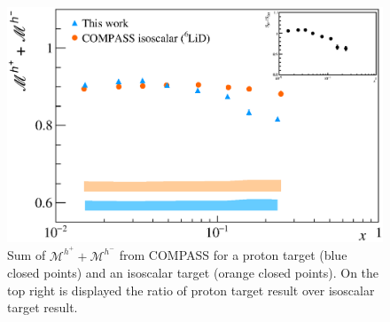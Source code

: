 \begin{figure}[!h]
  \centering
	\includegraphics[scale=0.5]{./gfx/Mult_h_sum.eps}
	\caption{Sum of $\mathscr{M}^{h^+}+\mathscr{M}^{h^-}$ from COMPASS for a proton target (blue closed points) and an isoscalar target (orange closed points). On the top right is displayed the ratio of proton target result over isoscalar target result.}
	\label{pic:hsum}
\end{figure}

